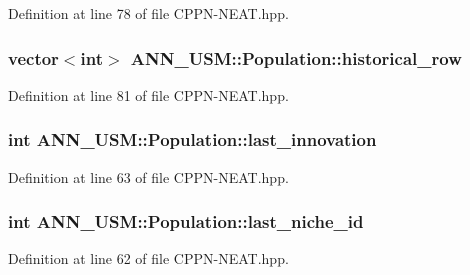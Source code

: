 Definition at line 78 of file C\-P\-P\-N-\/\-N\-E\-A\-T.\-hpp.

\hypertarget{class_a_n_n___u_s_m_1_1_population_ad2643c1369c231da3de9878dfaa0ccf2}{
\subsubsection[{historical\-\_\-row}]{\setlength{\rightskip}{0pt plus 5cm}vector$<$int$>$ A\-N\-N\-\_\-\-U\-S\-M\-::\-Population\-::historical\-\_\-row}}\label{class_a_n_n___u_s_m_1_1_population_ad2643c1369c231da3de9878dfaa0ccf2}


Definition at line 81 of file C\-P\-P\-N-\/\-N\-E\-A\-T.\-hpp.

\hypertarget{class_a_n_n___u_s_m_1_1_population_a836ae3c612ff56cac400ddea08893961}{
\subsubsection[{last\-\_\-innovation}]{\setlength{\rightskip}{0pt plus 5cm}int A\-N\-N\-\_\-\-U\-S\-M\-::\-Population\-::last\-\_\-innovation}}\label{class_a_n_n___u_s_m_1_1_population_a836ae3c612ff56cac400ddea08893961}


Definition at line 63 of file C\-P\-P\-N-\/\-N\-E\-A\-T.\-hpp.

\hypertarget{class_a_n_n___u_s_m_1_1_population_a609df33a9f9f1221ddf5604ef01dace5}{
\subsubsection[{last\-\_\-niche\-\_\-id}]{\setlength{\rightskip}{0pt plus 5cm}int A\-N\-N\-\_\-\-U\-S\-M\-::\-Population\-::last\-\_\-niche\-\_\-id}}\label{class_a_n_n___u_s_m_1_1_population_a609df33a9f9f1221ddf5604ef01dace5}


Definition at line 62 of file C\-P\-P\-N-\/\-N\-E\-A\-T.\-hpp.

